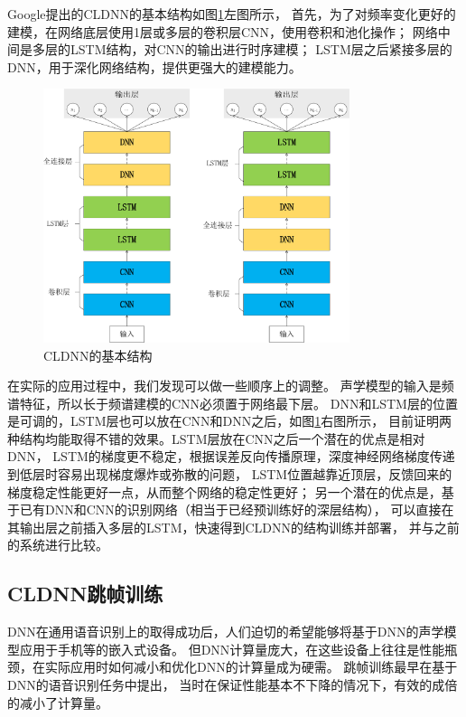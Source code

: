 Google提出的CLDNN的基本结构如图\ref{fig:cldnn}左图所示，
首先，为了对频率变化更好的建模，在网络底层使用1层或多层的卷积层CNN，使用卷积和池化操作；
网络中间是多层的LSTM结构，对CNN的输出进行时序建模；
LSTM层之后紧接多层的DNN，用于深化网络结构，提供更强大的建模能力。

\begin{figure}[htbp]
\centering
\includegraphics[width=0.8\textwidth]{figures/chapter3/cldnn-crop}
\caption{CLDNN的基本结构}
\label{fig:cldnn}
\end{figure}

在实际的应用过程中，我们发现可以做一些顺序上的调整。
声学模型的输入是频谱特征，所以长于频谱建模的CNN必须置于网络最下层。
DNN和LSTM层的位置是可调的，LSTM层也可以放在CNN和DNN之后，如图\ref{fig:cldnn}右图所示，
目前证明两种结构均能取得不错的效果。LSTM层放在CNN之后一个潜在的优点是相对DNN，
LSTM的梯度更不稳定，根据误差反向传播原理，深度神经网络梯度传递到低层时容易出现梯度爆炸或弥散的问题，
LSTM位置越靠近顶层，反馈回来的梯度稳定性能更好一点，从而整个网络的稳定性更好；
另一个潜在的优点是，基于已有DNN和CNN的识别网络（相当于已经预训练好的深层结构），
可以直接在其输出层之前插入多层的LSTM，快速得到CLDNN的结构训练并部署，
并与之前的系统进行比较。


\subsection{CLDNN跳帧训练}

DNN在通用语音识别上的取得成功后，人们迫切的希望能够将基于DNN的声学模型应用于手机等的嵌入式设备。
但DNN计算量庞大，在这些设备上往往是性能瓶颈，在实际应用时如何减小和优化DNN的计算量成为硬需。
跳帧训练最早在基于DNN的语音识别任务中提出，
当时在保证性能基本不下降的情况下，有效的成倍的减小了计算量。

